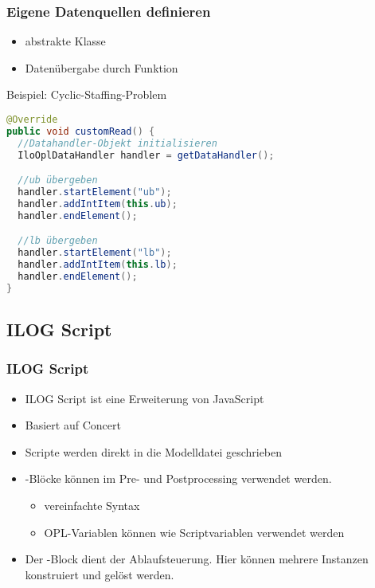 \begin{frame}[fragile]
 \frametitle{Eigene Datenquellen definieren}
 \begin{itemize}
  \item abstrakte Klasse 
  \item Datenübergabe durch Funktion 
 \end{itemize}
 \begin{block}{Beispiel: Cyclic-Staffing-Problem}
\begin{lstlisting}[language=java,numbers=none,basicstyle=\tiny\ttfamily]
@Override
public void customRead() {
  //Datahandler-Objekt initialisieren
  IloOplDataHandler handler = getDataHandler();

  //ub übergeben
  handler.startElement("ub");
  handler.addIntItem(this.ub);
  handler.endElement();

  //lb übergeben
  handler.startElement("lb");
  handler.addIntItem(this.lb);
  handler.endElement();
}
\end{lstlisting}
 \end{block}
\end{frame}

\subsection{ILOG Script}
\begin{frame}
 \frametitle{ILOG Script}
 \begin{itemize}
  \item ILOG Script ist eine Erweiterung von JavaScript
  \item Basiert auf Concert
  \item Scripte werden direkt in die Modelldatei geschrieben
  \item {}-Blöcke können im Pre- und Postprocessing verwendet werden.
  \begin{itemize}
   \item vereinfachte Syntax
   \item OPL-Variablen können wie Scriptvariablen verwendet werden
  \end{itemize}
  \item Der -Block dient der Ablaufsteuerung. Hier können mehrere Instanzen konstruiert und gelöst werden.
 \end{itemize}
\end{frame}
